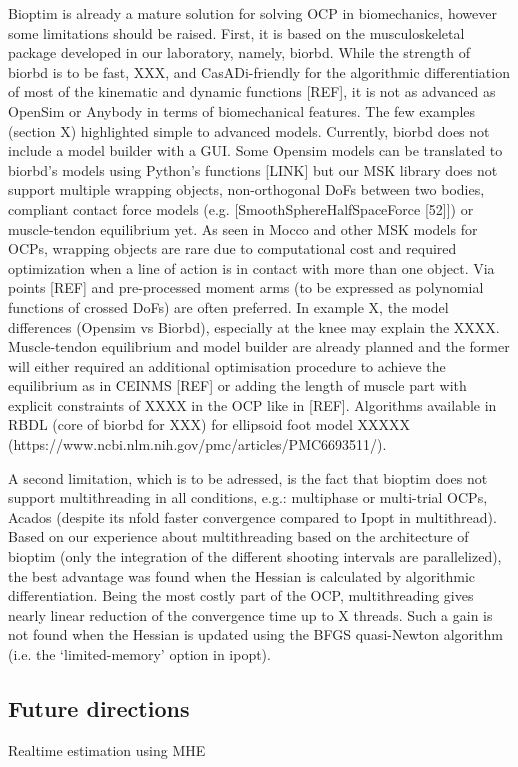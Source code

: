 Bioptim is already a mature solution for solving OCP in biomechanics, however some limitations should be raised. First, it is based on the musculoskeletal package developed in our laboratory, namely, biorbd. While the strength of biorbd is to be fast, XXX, and CasADi-friendly for the algorithmic differentiation of most of the kinematic and dynamic functions [REF], it is not as advanced as OpenSim or Anybody in terms of biomechanical features. The few examples (section X) highlighted simple to advanced models. Currently, biorbd does not include a model builder with a GUI. Some Opensim models can be translated to biorbd’s models using Python’s functions [LINK] but our MSK library does not support multiple wrapping objects, non-orthogonal DoFs between two bodies, compliant contact force models (e.g. [SmoothSphereHalfSpaceForce [52]]) or muscle-tendon equilibrium yet. As seen in Mocco and other MSK models for OCPs, wrapping objects are rare due to computational cost and required optimization when a line of action is in contact with more than one object. Via points [REF] and pre-processed moment arms (to be expressed as polynomial functions of crossed DoFs) are often preferred. In example X, the model differences (Opensim vs Biorbd), especially at the knee may explain the XXXX. Muscle-tendon equilibrium and model builder are already planned and the former will either required an additional optimisation procedure to achieve the equilibrium as in CEINMS [REF] or adding the length of muscle part with explicit constraints of XXXX in the OCP like in [REF]. Algorithms available in RBDL (core of biorbd for XXX) for ellipsoid foot model XXXXX (https://www.ncbi.nlm.nih.gov/pmc/articles/PMC6693511/).  

A second limitation, which is to be adressed, is the fact that bioptim does not support multithreading in all conditions, e.g.: multiphase or multi-trial OCPs, Acados (despite its nfold faster convergence compared to Ipopt in multithread). Based on our experience about multithreading based on the architecture of bioptim (only the integration of the different shooting intervals are parallelized), the best advantage was found when the Hessian is calculated by algorithmic differentiation. Being the most costly part of the OCP, multithreading gives nearly linear reduction of the convergence time up to X threads. Such a gain is not found when the Hessian is updated using the BFGS quasi-Newton algorithm (i.e. the ‘limited-memory’ option in ipopt).  

\subsection{Future directions}
Realtime estimation using MHE

